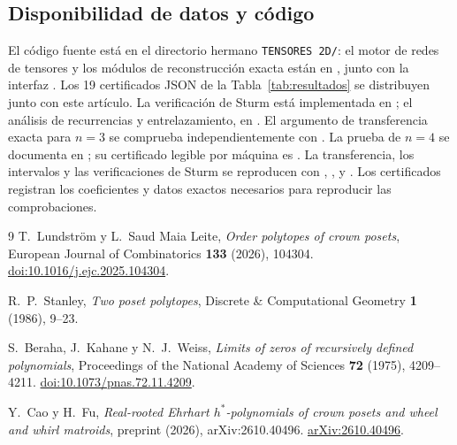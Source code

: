 \documentclass[11pt,a4paper]{article}
\theoremstyle{definition}
\begin{document}
\subsection{Disponibilidad de datos y código}
\label{sec:n4-reproducibilidad}

El código fuente está en el directorio hermano \texttt{TENSORES 2D/}:
el motor de redes de tensores y los módulos de reconstrucción exacta están
en , junto con la interfaz . Los 19 certificados
JSON de la Tabla~\ref{tab:resultados} se distribuyen junto con este
artículo. La verificación de Sturm está implementada en
; el análisis de recurrencias y entrelazamiento,
en . El argumento de transferencia exacta
para $n=3$ se comprueba independientemente con
. La prueba de $n=4$ se documenta en
; su certificado legible por
máquina es
. La transferencia,
los intervalos y las verificaciones de Sturm se reproducen con
,
,  y
. Los certificados registran
los coeficientes y datos exactos necesarios para reproducir las
comprobaciones.

\begin{thebibliography}{9}
T.~Lundstr\"om y L.~Saud Maia Leite,
\emph{Order polytopes of crown posets},
European Journal of Combinatorics \textbf{133} (2026), 104304.
\href{https://doi.org/10.1016/j.ejc.2025.104304}{doi:10.1016/j.ejc.2025.104304}.

R.~P.~Stanley,
\emph{Two poset polytopes},
Discrete \& Computational Geometry \textbf{1} (1986), 9--23.

{\raggedright
S.~Beraha, J.~Kahane y N.~J.~Weiss,
\emph{Limits of zeros of recursively defined polynomials},
Proceedings of the National Academy of Sciences \textbf{72} (1975), 4209--4211.
\href{https://doi.org/10.1073/pnas.72.11.4209}{doi:10.1073/pnas.72.11.4209}.\par}

Y.~Cao y H.~Fu,
\emph{Real-rooted Ehrhart $h^*$-polynomials of crown posets and wheel and whirl matroids},
preprint (2026), arXiv:2610.40496.
\href{https://arxiv.org/abs/2610.40496}{arXiv:2610.40496}.
\end{thebibliography}
\end{document}

